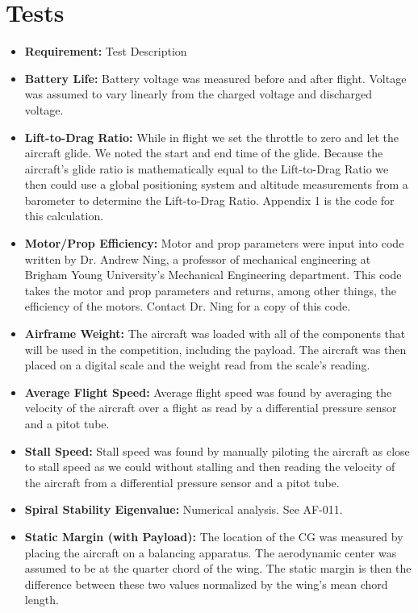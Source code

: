 \documentclass[]{auvsi_doc}
\begin{document}
\section{Tests}
\begin{itemize}
	\item \textbf{Requirement:} Test Description
	\item \textbf{Battery Life:} Battery voltage was measured before and after flight. Voltage was assumed to vary linearly from the charged voltage and discharged voltage.
	\item \textbf{Lift-to-Drag Ratio:} While in flight we set the throttle to zero and let the aircraft glide. We noted the start and end time of the glide. Because the aircraft's glide ratio is mathematically equal to the Lift-to-Drag Ratio we then could use a global positioning system and altitude measurements from a barometer to determine the  Lift-to-Drag Ratio. Appendix 1 is the code for this calculation.
	\item \textbf{Motor/Prop Efficiency:} Motor and prop parameters were input into code written by Dr. Andrew Ning, a professor of mechanical engineering at Brigham Young University's Mechanical Engineering department. This code takes the motor and prop parameters and returns, among other things, the efficiency of the motors. Contact Dr. Ning for a copy of this code. 
	\item \textbf{Airframe Weight:} The aircraft was loaded with all of the components that will be used in the competition, including the payload. The aircraft was then placed on a digital scale and the weight read from the scale's reading.
	\item \textbf{Average Flight Speed:} Average flight speed was found by averaging the velocity of the aircraft over a flight as read by a differential pressure sensor and a pitot tube.
	\item \textbf{Stall Speed:} Stall speed was found by manually piloting the aircraft as close to stall speed as we could without stalling and then reading the velocity of the aircraft from a differential pressure sensor and a pitot tube.
	\item \textbf{Spiral Stability Eigenvalue:} Numerical analysis. See AF-011.
	\item \textbf{Static Margin (with Payload):} The location of the CG was measured by placing the aircraft on a balancing apparatus. The aerodynamic center was assumed to be at the quarter chord of the wing. The static margin is then the difference between these two values normalized by the wing's mean chord length.

\end{itemize}
\end{document}
